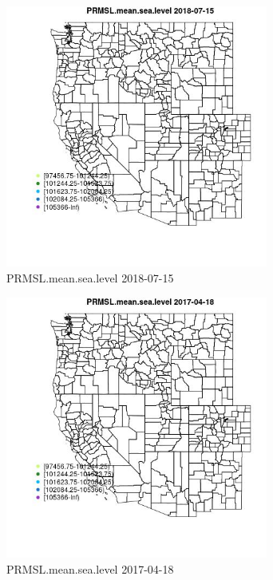 \begin{figure} 
\centering  
\includegraphics[width=0.77\textwidth]{Code_Outputs/Report_ML_input_PM25_Step4_part_e_de_duplicated_aveswNAs_MapObsPRMSLmeansealevel2018-07-15.jpg} 
\caption{\label{fig:Report_ML_input_PM25_Step4_part_e_de_duplicated_aveswNAsMapObsPRMSLmeansealevel2018-07-15}PRMSL.mean.sea.level 2018-07-15} 
\end{figure} 
 

\begin{figure} 
\centering  
\includegraphics[width=0.77\textwidth]{Code_Outputs/Report_ML_input_PM25_Step4_part_e_de_duplicated_aveswNAs_MapObsPRMSLmeansealevel2017-04-18.jpg} 
\caption{\label{fig:Report_ML_input_PM25_Step4_part_e_de_duplicated_aveswNAsMapObsPRMSLmeansealevel2017-04-18}PRMSL.mean.sea.level 2017-04-18} 
\end{figure} 
 

